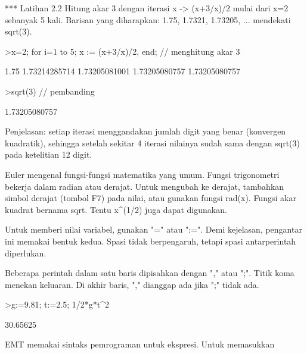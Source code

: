 \documentclass[a4paper,10pt]{article}
\begin{document}
\begin{eulernotebook}
\begin{euleroutput}
\end{euleroutput}
\begin{eulercomment}
*** Latihan 2.2
Hitung akar 3 dengan iterasi x -\textgreater{} (x+3/x)/2 mulai dari x=2 sebanyak 5 kali.
Barisan yang diharapkan: 1.75, 1.7321, 1.73205, ... mendekati sqrt(3).
\end{eulercomment}
\begin{eulerprompt}
>x=2; for i=1 to 5; x := (x+3/x)/2, end; // menghitung akar 3
\end{eulerprompt}
\begin{euleroutput}
  1.75
  1.73214285714
  1.73205081001
  1.73205080757
  1.73205080757
\end{euleroutput}
\begin{eulerprompt}
>sqrt(3)  // pembanding
\end{eulerprompt}
\begin{euleroutput}
  1.73205080757
\end{euleroutput}
\begin{eulercomment}
Penjelasan: setiap iterasi menggandakan jumlah digit yang benar (konvergen
kuadratik), sehingga setelah sekitar 4 iterasi nilainya sudah sama dengan
sqrt(3) pada ketelitian 12 digit.

\end{eulercomment}
\begin{eulercomment}
Euler mengenal fungsi-fungsi matematika yang umum. Fungsi trigonometri
bekerja dalam radian atau derajat. Untuk mengubah ke derajat, tambahkan
simbol derajat (tombol F7) pada nilai, atau gunakan fungsi rad(x). Fungsi
akar kuadrat bernama sqrt. Tentu x\textasciicircum{}(1/2) juga dapat digunakan.

Untuk memberi nilai variabel, gunakan "=" atau ":=". Demi kejelasan,
pengantar ini memakai bentuk kedua. Spasi tidak berpengaruh, tetapi spasi
antarperintah diperlukan.

Beberapa perintah dalam satu baris dipisahkan dengan "," atau ";". Titik
koma menekan keluaran. Di akhir baris, "," dianggap ada jika ";" tidak ada.
\end{eulercomment}
\begin{eulerprompt}
>g:=9.81; t:=2.5; 1/2*g*t^2
\end{eulerprompt}
\begin{euleroutput}
  30.65625
\end{euleroutput}
\begin{eulercomment}
EMT memakai sintaks pemrograman untuk ekspresi. Untuk memasukkan


\end{eulercomment}
\end{eulernotebook}
\end{document}
